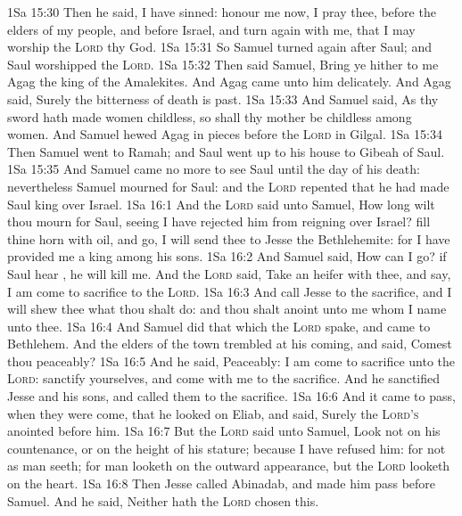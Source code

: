 \vs 1Sa 15:30 Then he said, I have sinned:  honour me now, I pray thee, before the elders of my people, and before Israel, and turn again with me, that I may worship the \textsc{Lord} thy God.
\vs 1Sa 15:31 So Samuel turned again after Saul; and Saul worshipped the \textsc{Lord}.
\vs 1Sa 15:32 Then said Samuel, Bring ye hither to me Agag the king of the Amalekites. And Agag came unto him delicately. And Agag said, Surely the bitterness of death is past.
\vs 1Sa 15:33 And Samuel said, As thy sword hath made women childless, so shall thy mother be childless among women. And Samuel hewed Agag in pieces before the \textsc{Lord} in Gilgal.
\vs 1Sa 15:34 Then Samuel went to Ramah; and Saul went up to his house to Gibeah of Saul.
\vs 1Sa 15:35 And Samuel came no more to see Saul until the day of his death: nevertheless Samuel mourned for Saul: and the \textsc{Lord} repented that he had made Saul king over Israel.
\vs 1Sa 16:1 And the \textsc{Lord} said unto Samuel, How long wilt thou mourn for Saul, seeing I have rejected him from reigning over Israel? fill thine horn with oil, and go, I will send thee to Jesse the Bethlehemite: for I have provided me a king among his sons.
\vs 1Sa 16:2 And Samuel said, How can I go? if Saul hear , he will kill me. And the \textsc{Lord} said, Take an heifer with thee, and say, I am come to sacrifice to the \textsc{Lord}.
\vs 1Sa 16:3 And call Jesse to the sacrifice, and I will shew thee what thou shalt do: and thou shalt anoint unto me  whom I name unto thee.
\vs 1Sa 16:4 And Samuel did that which the \textsc{Lord} spake, and came to Bethlehem. And the elders of the town trembled at his coming, and said, Comest thou peaceably?
\vs 1Sa 16:5 And he said, Peaceably: I am come to sacrifice unto the \textsc{Lord}: sanctify yourselves, and come with me to the sacrifice. And he sanctified Jesse and his sons, and called them to the sacrifice.
\vs 1Sa 16:6 And it came to pass, when they were come, that he looked on Eliab, and said, Surely the \textsc{Lord's} anointed  before him.
\vs 1Sa 16:7 But the \textsc{Lord} said unto Samuel, Look not on his countenance, or on the height of his stature; because I have refused him: for  not as man seeth; for man looketh on the outward appearance, but the \textsc{Lord} looketh on the heart.
\vs 1Sa 16:8 Then Jesse called Abinadab, and made him pass before Samuel. And he said, Neither hath the \textsc{Lord} chosen this.
